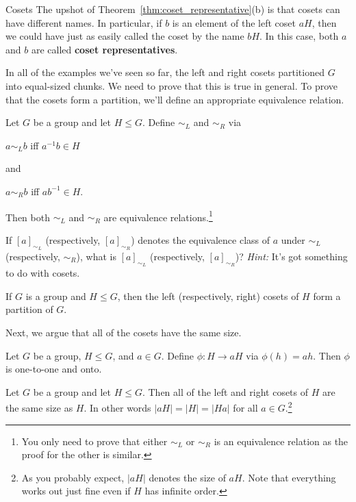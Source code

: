 \begin{section}{Cosets}
The upshot of Theorem~\ref{thm:coset_representative}(b) is that cosets can have different names.  In particular, if \(b\) is an element of the left coset \(aH\), then we could have just as easily called the coset by the name \(bH\).  In this case, both \(a\) and \(b\) are called \textbf{coset representatives}.

In all of the examples we've seen so far, the left and right cosets partitioned \(G\) into equal-sized chunks.  We need to prove that this is true in general.  To prove that the cosets form a partition, we'll define an appropriate equivalence relation.

\begin{theorem}
Let \(G\) be a group and let \(H\leq G\).  Define \(\sim_L\) and \(\sim_R\) via 
\begin{center}
\(a\sim_L b\) iff \(a^{-1}b\in H\)
\end{center}
and
\begin{center}
\(a\sim_R b\) iff \(ab^{-1}\in H\).
\end{center}
Then both \(\sim_L\) and \(\sim_R\) are equivalence relations.\footnote{You only need to prove that either \(\sim_L\) or \(\sim_R\) is an equivalence relation as the proof for the other is similar.}
\end{theorem}

\begin{problem}
If \([a]_{\sim_L}\) (respectively, \([a]_{\sim_R}\)) denotes the equivalence class of \(a\) under \(\sim_L\) (respectively, \(\sim_R\)), what is \([a]_{\sim_L}\) (respectively, \([a]_{\sim_R}\))?  \emph{Hint:} It's got something to do with cosets.
\end{problem}

\begin{corollary}
If \(G\) is a group and \(H\leq G\), then the left (respectively, right) cosets of \(H\) form a partition of \(G\).
\end{corollary}

Next, we argue that all of the cosets have the same size.

\begin{theorem}
Let \(G\) be a group, \(H\leq G\), and \(a\in G\).  Define \(\phi:H\to aH\) via \(\phi(h)=ah\).  Then \(\phi\) is one-to-one and onto.
\end{theorem}

\begin{corollary}\label{cor:cosets_same_size}
Let \(G\) be a group and let \(H\leq G\).  Then all of the left and right cosets of \(H\) are the same size as \(H\).  In other words \(|aH|=|H|=|Ha|\) for all \(a\in G\).\footnote{As you probably expect, \(|aH|\) denotes the size of \(aH\). Note that everything works out just fine even if \(H\) has infinite order.}
\end{corollary}

\end{section}

